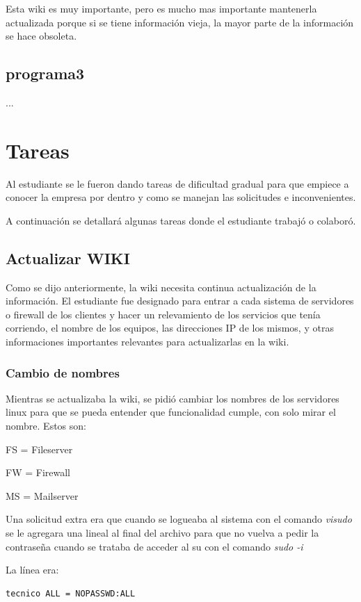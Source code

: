 \documentclass[12pt,a4paper]{article}
\begin{document}
Esta wiki es muy importante, pero es mucho mas importante mantenerla actualizada porque si se tiene información vieja, la mayor parte de la información se hace obsoleta. 

\subsection{programa3}
...

\section{Tareas}
Al estudiante se le fueron dando tareas de dificultad gradual para que empiece a conocer la empresa por dentro y como se manejan las solicitudes e inconvenientes.

A continuación se detallará algunas tareas donde el estudiante trabajó o colaboró.

\subsection{Actualizar WIKI}
Como se dijo anteriormente, la wiki necesita continua actualización de la información. El estudiante fue designado para entrar a cada sistema de servidores o firewall de los clientes y hacer un relevamiento de los servicios que tenía corriendo, el nombre de los equipos, las direcciones IP de los mismos, y otras informaciones importantes relevantes para actualizarlas en la wiki. 

\subsubsection{Cambio de nombres}
Mientras se actualizaba la wiki, se pidió cambiar los nombres de los servidores linux para que se pueda entender que funcionalidad cumple, con solo mirar el nombre. Estos son:

FS = Fileserver

FW = Firewall

MS = Mailserver

Una solicitud extra era que cuando se logueaba al sistema con el comando \textit{visudo} se le agregara una lineal al final del archivo para que no vuelva a pedir la contraseña cuando se trataba de acceder al su con el comando \textit{sudo -i} 

La línea era:
\begin{lstlisting}
tecnico ALL = NOPASSWD:ALL
\end{lstlisting}
\end{document}
